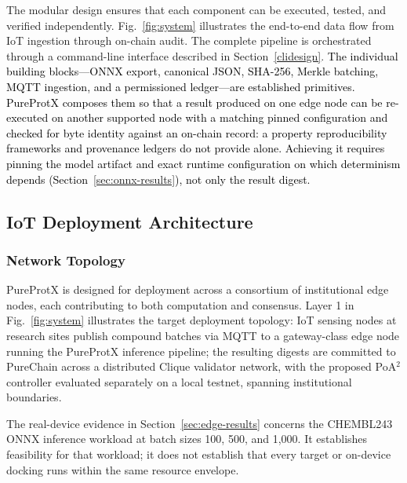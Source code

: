 \documentclass[conference]{IEEEtran}
\newcommand{\rev}[2]{#2}
\begin{document}
The modular design ensures that each component can be executed,
tested, and verified independently.
Fig.~\ref{fig:system} illustrates the end-to-end data flow from
IoT ingestion through on-chain audit.
The complete pipeline is orchestrated through a command-line
interface described in Section~\ref{clidesign}.
\textcolor{black}{The individual building blocks---ONNX export,
canonical JSON, SHA-256, Merkle batching, MQTT ingestion,
and a permissioned ledger---are established primitives.
PureProtX composes them so that a result produced on one
edge node can be re-executed on another \rev{R1.1}{supported node with a matching pinned configuration and checked for byte identity against an on-chain record}: a property
reproducibility frameworks and provenance ledgers do not
provide alone. Achieving it requires pinning the model
artifact and exact runtime configuration on which
determinism depends (Section~\ref{sec:onnx-results}), not
only the result digest.}

\subsection{\textbf{IoT Deployment Architecture}}
\label{sec:iot-arch}

\subsubsection{Network Topology}

PureProtX is designed for deployment across a consortium of
institutional edge nodes, each contributing to both computation
and consensus. Layer 1 in
Fig.~\ref{fig:system} illustrates the target deployment topology:
IoT sensing nodes at research sites publish compound batches via
MQTT to a gateway-class edge node running the PureProtX inference
pipeline; the resulting digests are committed to PureChain across
a distributed \rev{R1.2, R1.3, R2.4}{Clique validator network, with the proposed PoA$^2$ controller evaluated separately on a local testnet,} spanning institutional
boundaries.

\rev{R1.1}{The real-device evidence in Section~\ref{sec:edge-results}
concerns the CHEMBL243 ONNX inference workload at batch sizes
100, 500, and 1,000. It establishes feasibility for that workload;
it does not establish that every target or on-device docking runs
within the same resource envelope.}
\end{document}
